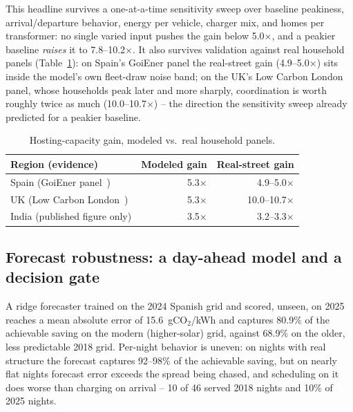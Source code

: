 \documentclass[journal]{IEEEtran}
\begin{document}
This headline survives a one-at-a-time sensitivity sweep over baseline peakiness, arrival/departure behavior, energy per vehicle, charger mix, and homes per transformer: no single varied input pushes the gain below 5.0$\times$, and a peakier baseline \emph{raises} it to 7.8--10.2$\times$. It also survives validation against real household panels (Table~\ref{tab:validation}): on Spain's GoiEner panel the real-street gain (4.9--5.0$\times$) sits inside the model's own fleet-draw noise band; on the UK's Low Carbon London panel, whose households peak later and more sharply, coordination is worth roughly twice as much (10.0--10.7$\times$) -- the direction the sensitivity sweep already predicted for a peakier baseline.
\begin{table}[t]
\centering
\caption{Hosting-capacity gain, modeled vs.\ real household panels.}
\label{tab:validation}
\begin{tabular}{lrr}
\toprule
\textbf{Region (evidence)} & \textbf{Modeled gain} & \textbf{Real-street gain} \\
\midrule
Spain (GoiEner panel~\cite{quesada2024goiener}) & 5.3$\times$ & 4.9--5.0$\times$ \\
UK (Low Carbon London~\cite{tindemans2023lcl}) & 5.3$\times$ & 10.0--10.7$\times$ \\
India (published figure only) & 3.5$\times$ & 3.2--3.3$\times$ \\
\bottomrule
\end{tabular}
\end{table}

\subsection{Forecast robustness: a day-ahead model and a decision gate}
A ridge forecaster trained on the 2024 Spanish grid and scored, unseen, on 2025 reaches a mean absolute error of 15.6~gCO$_2$/kWh and captures 80.9\% of the achievable saving on the modern (higher-solar) grid, against 68.9\% on the older, less predictable 2018 grid. Per-night behavior is uneven: on nights with real structure the forecast captures 92--98\% of the achievable saving, but on nearly flat nights forecast error exceeds the spread being chased, and scheduling on it does worse than charging on arrival -- 10 of 46 served 2018 nights and 10\% of 2025 nights.
\end{document}

